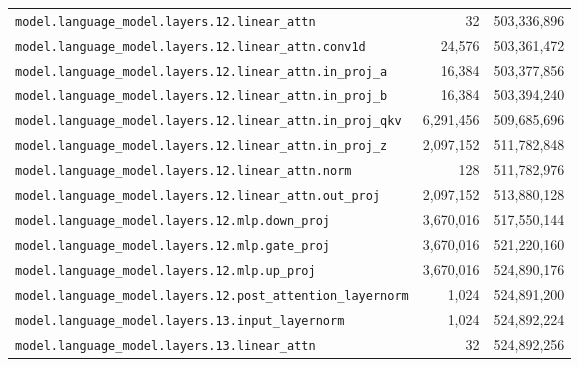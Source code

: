 \documentclass[10pt,a4paper]{article}
\theoremstyle{definition}
\begin{document}
\begin{appendices}
\begin{longtable}{p{9.5cm}rr}
\texttt{model.\allowbreak{}language\_model.\allowbreak{}layers.\allowbreak{}12.\allowbreak{}linear\_attn} & 32 & 503,336,896 \\
\texttt{model.\allowbreak{}language\_model.\allowbreak{}layers.\allowbreak{}12.\allowbreak{}linear\_attn.\allowbreak{}conv1d} & 24,576 & 503,361,472 \\
\texttt{model.\allowbreak{}language\_model.\allowbreak{}layers.\allowbreak{}12.\allowbreak{}linear\_attn.\allowbreak{}in\_proj\_a} & 16,384 & 503,377,856 \\
\texttt{model.\allowbreak{}language\_model.\allowbreak{}layers.\allowbreak{}12.\allowbreak{}linear\_attn.\allowbreak{}in\_proj\_b} & 16,384 & 503,394,240 \\
\texttt{model.\allowbreak{}language\_model.\allowbreak{}layers.\allowbreak{}12.\allowbreak{}linear\_attn.\allowbreak{}in\_proj\_qkv} & 6,291,456 & 509,685,696 \\
\texttt{model.\allowbreak{}language\_model.\allowbreak{}layers.\allowbreak{}12.\allowbreak{}linear\_attn.\allowbreak{}in\_proj\_z} & 2,097,152 & 511,782,848 \\
\texttt{model.\allowbreak{}language\_model.\allowbreak{}layers.\allowbreak{}12.\allowbreak{}linear\_attn.\allowbreak{}norm} & 128 & 511,782,976 \\
\texttt{model.\allowbreak{}language\_model.\allowbreak{}layers.\allowbreak{}12.\allowbreak{}linear\_attn.\allowbreak{}out\_proj} & 2,097,152 & 513,880,128 \\
\texttt{model.\allowbreak{}language\_model.\allowbreak{}layers.\allowbreak{}12.\allowbreak{}mlp.\allowbreak{}down\_proj} & 3,670,016 & 517,550,144 \\
\texttt{model.\allowbreak{}language\_model.\allowbreak{}layers.\allowbreak{}12.\allowbreak{}mlp.\allowbreak{}gate\_proj} & 3,670,016 & 521,220,160 \\
\texttt{model.\allowbreak{}language\_model.\allowbreak{}layers.\allowbreak{}12.\allowbreak{}mlp.\allowbreak{}up\_proj} & 3,670,016 & 524,890,176 \\
\texttt{model.\allowbreak{}language\_model.\allowbreak{}layers.\allowbreak{}12.\allowbreak{}post\_attention\_layernorm} & 1,024 & 524,891,200 \\
\texttt{model.\allowbreak{}language\_model.\allowbreak{}layers.\allowbreak{}13.\allowbreak{}input\_layernorm} & 1,024 & 524,892,224 \\
\texttt{model.\allowbreak{}language\_model.\allowbreak{}layers.\allowbreak{}13.\allowbreak{}linear\_attn} & 32 & 524,892,256 \\

\end{longtable}
\end{appendices}
\end{document}
